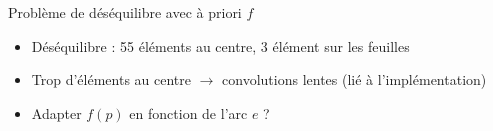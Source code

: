\begin{frame}{Problème de déséquilibre avec à priori $f$}
\begin{itemize}
\item \alert{Déséquilibre :} 55 éléments au centre, 3 élément sur les feuilles
	\begin{figure}\centering
	\end{figure}
\item Trop d'éléments au centre $\rightarrow$ convolutions lentes (lié à l'implémentation)
\item Adapter $f(p)$ en fonction de l'arc $e$ ?

\end{itemize}
\end{frame}



